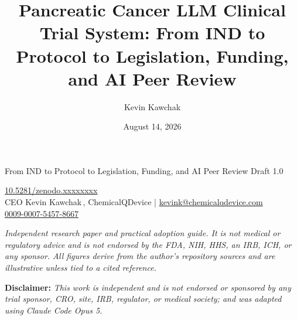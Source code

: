\documentclass[11pt]{article}
\title{Pancreatic Cancer LLM Clinical Trial System: From IND to Protocol to
Legislation, Funding, and AI Peer Review}
\author{Kevin Kawchak}
\date{August 14, 2026}
\begin{document}
\thispagestyle{plain}

%
{From IND to Protocol to Legislation, Funding, and AI Peer Review}%
{Draft 1.0}

\vspace{-0.55em}

\begin{center}
 \enspace {} \enspace
{} \enspace {} \enspace
{}
\end{center}

\vspace{0.35em}

\begin{center}\small
\href{https://doi.org/10.5281/zenodo.xxxxxxxx}{10.5281/zenodo.xxxxxxxx}\\[0.30em]
CEO Kevin Kawchak\,, ChemicalQDevice \;|\;
\href{mailto:kevink@chemicalqdevice.com}{kevink@chemicalqdevice.com}\\[0.20em]
\href{https://orcid.org/0009-0007-5457-8667}{0009-0007-5457-8667}
\end{center}

\vspace{0.35em}
\apprule{1pt}

\noindent\footnotesize\textit{Independent research paper and practical adoption
guide. It is not medical or regulatory advice and is not endorsed by the FDA,
NIH, HHS, an IRB, ICH, or any sponsor. All figures derive from the author's
repository sources and are illustrative unless tied to a cited
reference.}\normalsize\par

\vspace{0.12em}

\noindent\footnotesize\textbf{Disclaimer:} \textit{This work is independent and
is not endorsed or sponsored by any trial sponsor, CRO, site, IRB, regulator, or
medical society; and was adapted using Claude Code Opus 5.}\normalsize\par
\end{document}

